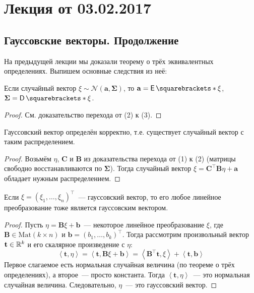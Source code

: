 \section{Лекция от 03.02.2017}
\subsection{Гауссовские векторы. Продолжение}
На предыдущей лекции мы доказали теорему о трёх эквивалентных определениях. Выпишем основные следствия из неё:
\begin{consequence}
	Если случайный вектор \(\xi \sim \mathcal{N}(\mathbf{a}, \mathbf{\Sigma})\), то \(\mathbf{a} = \E{\xi}\), \(\mathbf{\Sigma} = \D{\xi}\).
\end{consequence}
\begin{proof}
	См. доказательство перехода от (2) к (3).
\end{proof}

\begin{consequence}
	Гауссовский вектор определён корректно, т.е. существует случайный вектор с таким распределением.
\end{consequence}
\begin{proof}
	Возьмём \(\eta\), \(\mathbf{C}\) и \(\mathbf{B}\) из доказательства перехода от (1) к (2) (матрицы свободно восстанавливаются по \(\mathbf{\Sigma}\)). Тогда случайный вектор \(\xi = \mathbf{C^{\top}B}\eta + \mathbf{a}\) обладает нужным распределением.
\end{proof}
\begin{consequence}
	Если \(\xi = (\xi_1, \dots, \xi_n)^{\top}\)~--- гауссовский вектор, то его любое линейное преобразование тоже является гауссовским вектором.
\end{consequence}
\begin{proof}
	Пусть \(\eta = \mathbf{B}\xi + \mathbf{b}\)~--- некоторое линейное преобразование \(\xi\), где \(\mathbf{B} \in \mathrm{Mat}(k \times n)\) и \(\mathbf{b} = (b_1, \dots, b_k)^{\top}\). Тогда рассмотрим произвольный вектор \(\mathbf{t} \in \mathbb{R}^k\) и его скалярное произведение с \(\eta\):
	\[
		\left\langle \mathbf{t}, \eta\right\rangle = \left\langle \mathbf{t}, \mathbf{B}\xi + \mathbf{b}\right\rangle = \left\langle \mathbf{B^{\top}t}, \xi\right\rangle + \left\langle \mathbf{t}, \mathbf{b}\right\rangle
	\]
	Первое слагаемое есть нормальная случайная величина (по теореме о трёх определениях), а второе~--- просто константа. Тогда \(\left\langle \mathbf{t}, \eta\right\rangle\)~--- это нормальная случайная величина. Следовательно, \(\eta\)~--- это гауссовский вектор.
\end{proof}

